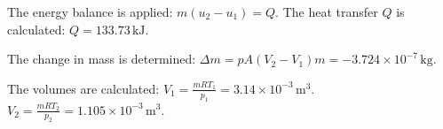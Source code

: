 The energy balance is applied:  
\( m (u_2 - u_1) = Q \).  
The heat transfer \( Q \) is calculated:  
\( Q = 133.73 \, \text{kJ} \).  

The change in mass is determined:  
\( \Delta m = pA (V_2 - V_1) m = -3.724 \times 10^{-7} \, \text{kg} \).  

The volumes are calculated:  
\( V_1 = \frac{mRT_1}{p_1} = 3.14 \times 10^{-3} \, \text{m}^3 \).  
\( V_2 = \frac{mRT_2}{p_2} = 1.105 \times 10^{-3} \, \text{m}^3 \).
